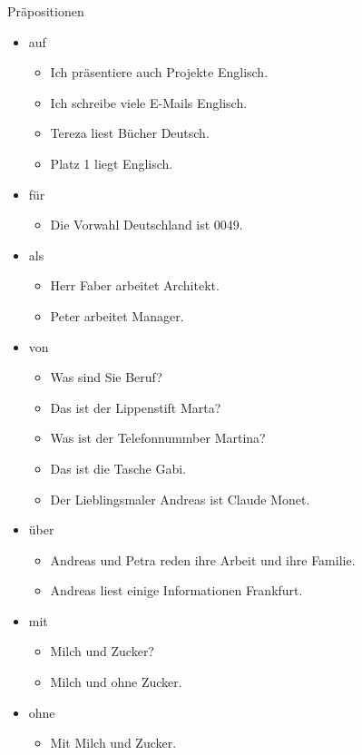 \begin{syntax}{Präpositionen}{}

\begin{itemize}
	\item auf \begin{itemize}
		\item Ich präsentiere auch Projekte  Englisch.
		\item Ich schreibe viele E-Mails  Englisch.
		\item Tereza liest Bücher  Deutsch.
		\item {} Platz 1 liegt Englisch.
	\end{itemize}
	\item für \begin{itemize}
		\item Die Vorwahl  Deutschland ist 0049.
	\end{itemize}
	\item als \begin{itemize}
		\item Herr Faber arbeitet  Architekt.
		\item Peter arbeitet  Manager.
	\end{itemize}
	\item von \begin{itemize}
		\item Was sind Sie  Beruf?
		\item Das ist der Lippenstift  Marta?
		\item Was ist der Telefonnummber  Martina?
		\item Das ist die Tasche  Gabi.
		\item Der Lieblingsmaler  Andreas ist Claude Monet.
	\end{itemize}
	\item über \begin{itemize}
		\item Andreas und Petra reden  ihre Arbeit und ihre Familie.
		\item Andreas liest einige Informationen  Frankfurt.
	\end{itemize}
	\item mit \begin{itemize}
		\item {} Milch und Zucker?
		\item {} Milch und ohne Zucker.
	\end{itemize}
	\item ohne \begin{itemize}
		\item Mit Milch und  Zucker.
	\end{itemize}
\end{itemize}
\end{syntax}
